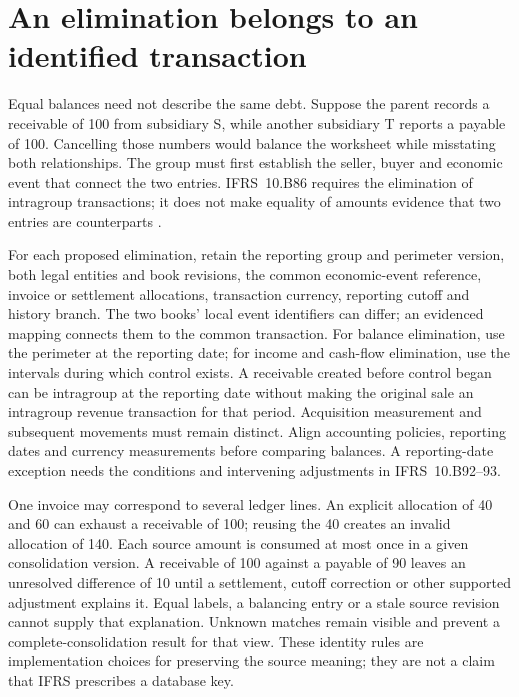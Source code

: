 \section{An elimination belongs to an identified transaction}
\label{sec:group-elimination-joins}

Equal balances need not describe the same debt. Suppose the parent records
a receivable of 100 from subsidiary S, while another subsidiary T reports a
payable of 100. Cancelling those numbers would balance the worksheet while
misstating both relationships. The group must first establish the seller,
buyer and economic event that connect the two entries. IFRS~10.B86 requires
the elimination of intragroup transactions; it does not make equality of
amounts evidence that two entries are counterparts
\citep[IFRS~10.B86--88, B92--93]{eu20231803}.

For each proposed elimination, retain the reporting group and perimeter
version, both legal entities and book revisions, the common economic-event
reference, invoice or settlement allocations, transaction currency, reporting
cutoff and history branch. The two books' local event identifiers can differ;
an evidenced mapping connects them to the common transaction. For balance elimination,
use the perimeter at the reporting date; for income and cash-flow elimination,
use the intervals during which control exists. A receivable created before
control began can be intragroup at the reporting date without making the
original sale an intragroup revenue transaction for that period. Acquisition
measurement and subsequent movements must remain distinct. Align accounting
policies, reporting dates and currency measurements before comparing balances. A reporting-date exception
needs the conditions and intervening adjustments in IFRS~10.B92--93.

One invoice may correspond to several ledger lines. An explicit allocation
of 40 and 60 can exhaust a receivable of 100; reusing the 40 creates an
invalid allocation of 140. Each source amount is consumed at most once in a
given consolidation version. A receivable of 100 against a payable of 90
leaves an unresolved difference of 10 until a settlement, cutoff correction
or other supported adjustment explains it. Equal labels, a balancing entry
or a stale source revision cannot supply that explanation. Unknown matches
remain visible and prevent a complete-consolidation result for that view.
These identity rules are implementation choices for preserving the source
meaning; they are not a claim that IFRS prescribes a database key.


